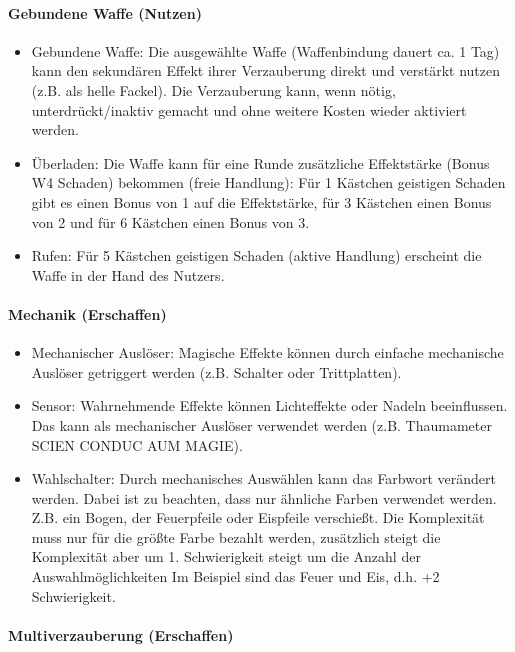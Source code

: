 \documentclass{article}
\begin{document}
\paragraph{Gebundene Waffe (Nutzen)}

\begin{itemize}
\item Gebundene Waffe: Die ausgewählte Waffe (Waffenbindung dauert ca. 1 Tag) kann den sekundären Effekt ihrer Verzauberung direkt und verstärkt nutzen (z.B. als helle Fackel). Die Verzauberung kann, wenn nötig, unterdrückt/inaktiv gemacht und ohne weitere Kosten wieder aktiviert werden.
\item Überladen: Die Waffe kann für eine Runde zusätzliche Effektstärke (Bonus W4 Schaden) bekommen (freie Handlung): Für 1 Kästchen geistigen Schaden gibt es einen Bonus von 1 auf die Effektstärke, für 3 Kästchen einen Bonus von 2 und für 6 Kästchen einen Bonus von 3.
\item Rufen: Für 5 Kästchen geistigen Schaden (aktive Handlung) erscheint die Waffe in der Hand des Nutzers.
\end{itemize}

\paragraph{Mechanik (Erschaffen)}

\begin{itemize}
\item Mechanischer Auslöser: Magische Effekte können durch einfache mechanische Auslöser getriggert werden (z.B. Schalter oder Trittplatten).
\item Sensor: Wahrnehmende Effekte können Lichteffekte oder Nadeln beeinflussen. Das kann als mechanischer Auslöser verwendet werden (z.B. Thaumameter SCIEN CONDUC AUM MAGIE).
\item Wahlschalter: Durch mechanisches Auswählen kann das Farbwort verändert werden. Dabei ist zu beachten, dass nur ähnliche Farben verwendet werden. Z.B. ein Bogen, der Feuerpfeile oder Eispfeile verschießt. Die Komplexität muss nur für die größte Farbe bezahlt werden, zusätzlich steigt die Komplexität aber um 1. Schwierigkeit steigt um die Anzahl der Auswahlmöglichkeiten  Im Beispiel sind das Feuer und Eis, d.h. +2 Schwierigkeit.
\end{itemize}

\paragraph{Multiverzauberung (Erschaffen)}
\end{document}
